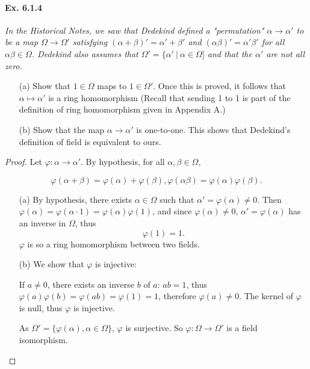 \documentclass[11pt,a4paper]{article}
\begin{document}
\paragraph{Ex. 6.1.4}

{\it In the Historical Notes, we saw that Dedekind defined a "permutation" $\alpha \to \alpha'$ to be a map $\Omega \to \Omega'$ satisfying $(\alpha + \beta)' = \alpha' + \beta'$ and $(\alpha \beta)' = \alpha' \beta'$ for all $\alpha \beta \in \Omega$. Dedekind also assumes that $\Omega' =\{\alpha' \ \vert \ \alpha \in \Omega]$ and that the $\alpha'$ are not all zero.
\begin{enumerate}
\item[(a)] Show that $1 \in \Omega$ maps to $1 \in \Omega'$. Once this is proved, it follows that $\alpha \mapsto \alpha'$ is a ring homomorphism (Recall that sending 1 to 1 is part of the definition of ring homomorphism given in Appendix A.)
\item[(b)] Show that the map $\alpha \to \alpha'$ is one-to-one.
This shows that Dedekind's definition of field is equivalent to ours.
\end{enumerate}
}

\begin{proof}

Let $\varphi : \alpha \to \alpha'$. By hypothesis, for all  $\alpha, \beta \in \Omega,$

$$\varphi(\alpha + \beta) =\varphi(\alpha)+ \varphi(\beta), \varphi(\alpha \beta) =\varphi(\alpha)\varphi(\beta).$$
\begin{enumerate}
\item[(a)]
By hypothesis, there exists $\alpha \in \Omega$ such that $\alpha' = \varphi(\alpha) \neq 0$. Then $\varphi(\alpha) = \varphi(\alpha \cdot 1) = \varphi(\alpha) \varphi(1)$, and since $\varphi(\alpha) \neq 0$, $\alpha' = \varphi(\alpha)$ has an inverse in  $\Omega$, thus 
$$\varphi(1) = 1.$$
$\varphi$ is so a ring homomorphism between two fields.

\item[(b)]
We show that $\varphi$ is injective: 

If $a \neq 0$, there exists an inverse $b$ of $a$: $ab=1$, thus $\varphi(a) \varphi(b) = \varphi(ab) = \varphi(1) = 1$, therefore $\varphi(a) \neq 0$. The kernel of $\varphi$ is null, thus $\varphi$ is injective.

As $\Omega' = \{\varphi(\alpha) , \alpha \in \Omega\}$, $\varphi$ is surjective. So $\varphi : \Omega \to \Omega'$ is a field isomorphism.
\end{enumerate}
\end{proof}
\end{document}
